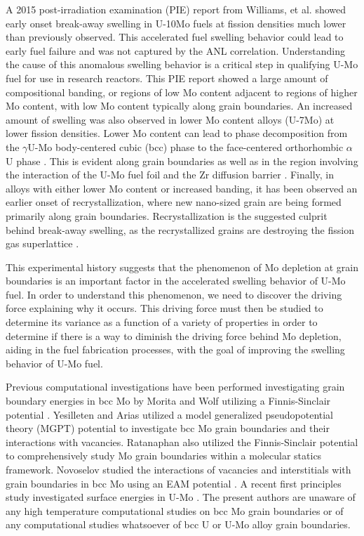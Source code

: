 \documentclass[review]{elsarticle}
\begin{document}
A 2015 post-irradiation examination (PIE) report \cite{afip6report} from Williams, et al. showed early onset break-away swelling in U-10Mo fuels at fission densities much lower than previously observed. This accelerated fuel swelling behavior could lead to early fuel failure and was not captured by the ANL correlation. Understanding the cause of this anomalous swelling behavior is a critical step in qualifying U-Mo fuel for use in research reactors. This PIE report showed a large amount of compositional banding, or regions of low Mo content adjacent to regions of higher Mo content, with low Mo content typically along grain boundaries. An increased amount of swelling was also observed in lower Mo content alloys (U-7Mo) \cite{vandenberghe2014} at lower fission densities. Lower Mo content can lead to phase decomposition from the $\gamma$U-Mo body-centered cubic (bcc) phase to the face-centered orthorhombic $\alpha$U phase \cite{janfong2014}. This is evident along grain boundaries as well as in the region involving the interaction of the U-Mo fuel foil and the Zr diffusion barrier \cite{park2015}. Finally, in alloys with either lower Mo content or increased banding, it has been observed an earlier onset of recrystallization\cite{kim2013A}, where new nano-sized grain are being formed primarily along grain boundaries. Recrystallization is the suggested culprit behind break-away swelling, as the recrystallized grains are destroying the fission gas superlattice \cite{vandenberghe2008}. 

This experimental history suggests that the phenomenon of Mo depletion at grain boundaries is an important factor in the accelerated swelling behavior of U-Mo fuel. In order to understand this phenomenon, we need to discover the driving force explaining why it occurs. This driving force must then be studied to determine its variance as a function of a variety of properties in order to determine if there is a way to diminish the driving force behind Mo depletion, aiding in the fuel fabrication processes, with the goal of improving the swelling behavior of U-Mo fuel.

Previous computational investigations have been performed investigating grain boundary energies in bcc Mo by Morita \cite{morita1997} and Wolf \cite{wolf1989bcc1, wolf1990bcc2} utilizing a Finnis-Sinclair potential \cite{finnis}. Yesilleten and Arias \cite{yesilleten2001} utilized a model generalized pseudopotential theory (MGPT) \cite{moriarty1988} potential to investigate bcc Mo grain boundaries and their interactions with vacancies. Ratanaphan \cite{ratanaphan2015} also utilized the Finnis-Sinclair potential \cite{finnis} to comprehensively study Mo grain boundaries within a molecular statics framework. Novoselov \cite{novoselov2014} studied the interactions of vacancies and interstitials with grain boundaries in bcc Mo using an EAM \cite{daw1984, daw1993} potential \cite{starikov2011}. A recent first principles study investigated surface energies in U-Mo \cite{zhigang2018}. The present authors are unaware of any high temperature computational studies on bcc Mo grain boundaries or of any computational studies whatsoever of bcc U or U-Mo alloy grain boundaries.
\end{document}
